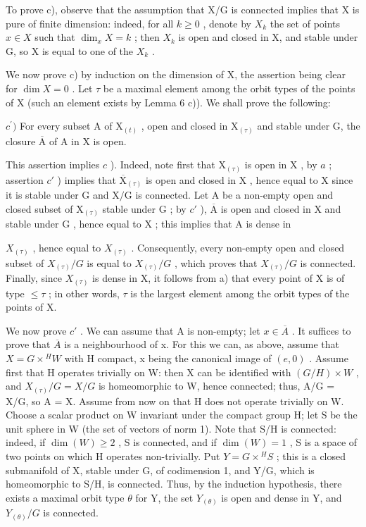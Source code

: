 To prove c), observe that the assumption that X/G is connected implies that X is pure of finite dimension: indeed, for all \(k \geq 0\) , denote by \(X_{k}\) the set of points \(x \in X\) such that \(\dim_{x} X = k\) ; then \(X_{k}\) is open and closed in X, and stable under G, so X is equal to one of the \(X_{k}\) .

We now prove c) by induction on the dimension of X, the assertion being clear for \(\dim X = 0\) . Let \(\tau\) be a maximal element among the orbit types of the points of X (such an element exists by Lemma 6 c)). We shall prove the following:

\(c^{\prime})\) For every subset A of \(\mathrm{X}_{(t)}\) , open and closed in \(\mathrm{X}_{(\tau)}\) and stable under G, the closure \(\overline{\mathrm{A}}\) of A in X is open.

This assertion implies \(c\) ). Indeed, note first that \(\mathrm{X}_{(\tau)}\) is open in \(\mathrm{X}\) , by \(a\) ; assertion \(c'\) ) implies that \(\overline{\mathrm{X}}_{(\tau)}\) is open and closed in \(\mathrm{X}\) , hence equal to \(\mathrm{X}\) since it is stable under \(\mathrm{G}\) and \(\mathrm{X} / \mathrm{G}\) is connected. Let \(\mathrm{A}\) be a non-empty open and closed subset of \(\mathrm{X}_{(\tau)}\) stable under \(\mathrm{G}\) ; by \(c'\) ), \(\overline{\mathrm{A}}\) is open and closed in \(\mathrm{X}\) and stable under \(\mathrm{G}\) , hence equal to \(\mathrm{X}\) ; this implies that \(\mathrm{A}\) is dense in

\(X_{(\tau)}\) , hence equal to \(X_{(\tau)}\) . Consequently, every non-empty open and closed subset of \(X_{(\tau)}/G\) is equal to \(X_{(\tau)}/G\) , which proves that \(X_{(\tau)}/G\) is connected. Finally, since \(X_{(\tau)}\) is dense in X, it follows from a) that every point of X is of type \(\leq \tau\) ; in other words, \(\tau\) is the largest element among the orbit types of the points of X.

We now prove \(c'\) . We can assume that A is non-empty; let \(x \in \overline{A}\) . It suffices to prove that \(\overline{A}\) is a neighbourhood of x. For this we can, as above, assume that \(X = G \times {}^{H}W\) with H compact, x being the canonical image of \((e,0)\) . Assume first that H operates trivially on W: then X can be identified with \((G/H) \times W\) , and \(X_{(\tau)}/G = X/G\) is homeomorphic to W, hence connected; thus, A/G = X/G, so A = X. Assume from now on that H does not operate trivially on W. Choose a scalar product on W invariant under the compact group H; let S be the unit sphere in W (the set of vectors of norm 1). Note that S/H is connected: indeed, if \(\dim(W) \geq 2\) , S is connected, and if \(\dim(W) = 1\) , S is a space of two points on which H operates non-trivially. Put \(Y = G \times {}^{H}S\) ; this is a closed submanifold of X, stable under G, of codimension 1, and Y/G, which is homeomorphic to S/H, is connected. Thus, by the induction hypothesis, there exists a maximal orbit type \(\theta\) for Y, the set \(Y_{(\theta)}\) is open and dense in Y, and \(Y_{(\theta)}/G\) is connected.

